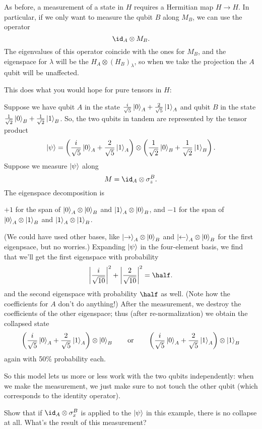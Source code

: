 \documentclass[11pt]{scrreprt}
\begin{document}
As before, a measurement of a state in $H$ requires
a Hermitian map $H \to H$.
In particular, if we only want to measure the qubit $B$ along $M_B$,
we can use the operator \[ \id_A \otimes M_B. \]
The eigenvalues of this operator coincide with the ones for $M_B$,
and the eigenspace for $\lambda$ will be the $H_A \otimes (H_B)_\lambda$,
so when we take the projection the $A$ qubit will be unaffected.

This does what you would hope for pure tensors in $H$:
\begin{example}
	Suppose we have qubit $A$ in the state
	$\frac{i}{\sqrt5}\ket0_A + \frac{2}{\sqrt5}\ket1_A$
	and qubit $B$ in the state
	$\frac{1}{\sqrt2} \ket0_B + \frac{1}{\sqrt2}\ket1_B$.
	So, the two qubits in tandem are represented by the tensor product
	\[
		\ket\psi
		=
		\left( \frac{i}{\sqrt5}\ket0_A + \frac{2}{\sqrt5}\ket1_A \right)
		\otimes
		\left( \frac{1}{\sqrt2} \ket0_B + \frac{1}{\sqrt2}\ket1_B \right).
	\]
	Suppose we measure $\ket\psi$ along 
	\[ M = \id_A \otimes \sigma_z^B. \]
	The eigenspace decomposition is
	\begin{itemize}
		\ii $+1$ for the span of $\ket0_A \otimes \ket0_B$ and
		$\ket1_A \otimes \ket0_B$, and
		\ii $-1$ for the span of $\ket0_A \otimes \ket1_B$ and
		$\ket1_A \otimes \ket1_B$.
	\end{itemize}
	(We could have used other bases, like $\ket\rightarrow_A \otimes \ket0_B$ and
	$\ket\leftarrow_A \otimes \ket0_B$ for the first eigenpsace, but no worries.)
	Expanding $\ket\psi$ in the four-element basis, we find that
	we'll get the first eigenspace with probability
	\[ \left|\frac{i}{\sqrt{10}}\right|^2
	+ \left|\frac{2}{\sqrt{10}}\right|^2 = \half. \]
	and the second eigenspace with probability $\half$ as well.
	(Note how the coefficients for $A$ don't do anything!)
	After the measurement, we destroy the coefficients of the other eigenspace;
	thus (after re-normalization) we obtain the collapsed state
	\[ \left( \frac{i}{\sqrt5}\ket0_A + \frac{2}{\sqrt5}\ket1_A \right)
		\otimes \ket0_B
		\qquad\text{or}\qquad
		\left( \frac{i}{\sqrt5}\ket0_A + \frac{2}{\sqrt5}\ket1_A \right)
		\otimes \ket1_B
	\]
	again with 50\% probability each.
\end{example}
So this model lets us more or less work with the two qubits independently:
when we make the measurement, we just make sure to not touch the other qubit
(which corresponds to the identity operator).

\begin{exercise}
	Show that if $\id_A \otimes \sigma_x^B$ is applied to the $\ket\psi$
	in this example, there is no collapse at all.
	What's the result of this measurement?
\end{exercise}
\end{document}
